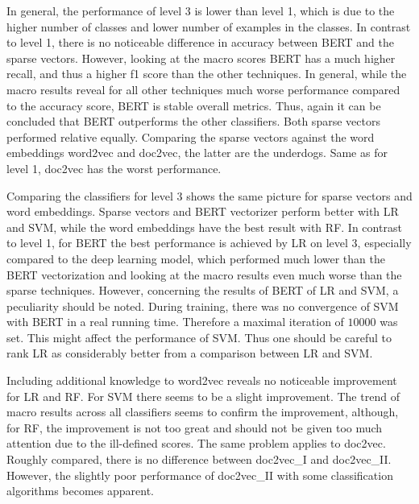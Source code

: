 \documentclass[12pt, a4paper, titlepage]{article}
\begin{document}
In general, the performance of level 3 is lower than level 1, which is due to the higher number of classes and lower number of examples in the classes. In contrast to level 1, there is no noticeable difference in accuracy between \ac{BERT} and the sparse vectors. However, looking at the macro scores \ac{BERT} has a much higher recall, and thus a higher f1 score than the other techniques. In general, while the macro results reveal for all other techniques much worse performance compared to the accuracy score, \ac{BERT} is stable overall metrics. Thus, again it can be concluded that \ac{BERT} outperforms the other classifiers. Both sparse vectors performed relative equally. Comparing the sparse vectors against the word embeddings word2vec and doc2vec, the latter are the underdogs. Same as for level 1, doc2vec has the worst performance. 

Comparing the classifiers for level 3 shows the same picture for sparse vectors and word embeddings. Sparse vectors and \ac{BERT} vectorizer perform better with \ac{LR} and \ac{SVM}, while the word embeddings have the best result with \ac{RF}. In contrast to level 1, for \ac{BERT} the best performance is achieved by \ac{LR} on level 3, especially compared to the deep learning model, which performed much lower than the \ac{BERT} vectorization and looking at the macro results even much worse than the sparse techniques. However, concerning the results of BERT of LR and SVM, a peculiarity should be noted. During training, there was no convergence of \ac{SVM} with \ac{BERT} in a real running time. Therefore a maximal iteration of $10000$ was set. This might affect the performance of \ac{SVM}. Thus one should be careful to rank \ac{LR} as considerably better from a comparison between \ac{LR} and \ac{SVM}. 

Including additional knowledge to word2vec reveals no noticeable improvement for \ac{LR} and \ac{RF}. For \ac{SVM} there seems to be a slight improvement. The trend of macro results across all classifiers seems to confirm the improvement, although, for RF, the improvement is not too great and should not be given too much attention due to the ill-defined scores. The same problem applies to doc2vec. Roughly compared, there is no difference between doc2vec\_I and doc2vec\_II. However, the slightly poor performance of doc2vec\_II with some classification algorithms becomes apparent. 
\end{document}
